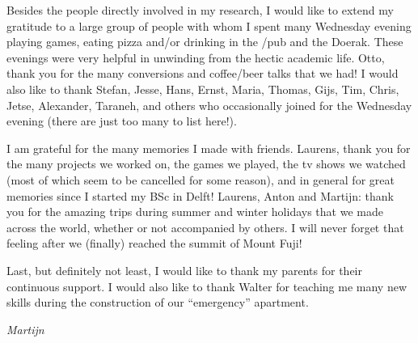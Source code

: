Besides the people directly involved in my research, I would like to extend my gratitude to a large group of people with whom I spent many Wednesday evening playing games, eating pizza and/or drinking in the /pub and the Doerak.
These evenings were very helpful in unwinding from the hectic academic life.
Otto, thank you for the many conversions and coffee/beer talks that we had!
I would also like to thank Stefan, Jesse, Hans, Ernst, Maria, Thomas, Gijs, Tim, Chris, Jetse, Alexander, Taraneh, and others who occasionally joined for the Wednesday evening (there are just too many to list here!).

I am grateful for the many memories I made with friends.
Laurens, thank you for the many projects we worked on, the games we played, the tv shows we watched (most of which seem to be cancelled for some reason), and in general for great memories since I started my BSc in Delft!
Laurens, Anton and Martijn: thank you for the amazing trips during summer and winter holidays that we made across the world, whether or not accompanied by others.
I will never forget that feeling after we (finally) reached the summit of Mount Fuji!\emojifuji{}

Last, but definitely not least, I would like to thank my parents for their continuous support.
I would also like to thank Walter for teaching me many new skills during the construction of our \enquote{emergency} apartment.

\begin{flushright}
{\makeatletter\itshape
    Martijn
\makeatother}
\end{flushright}
